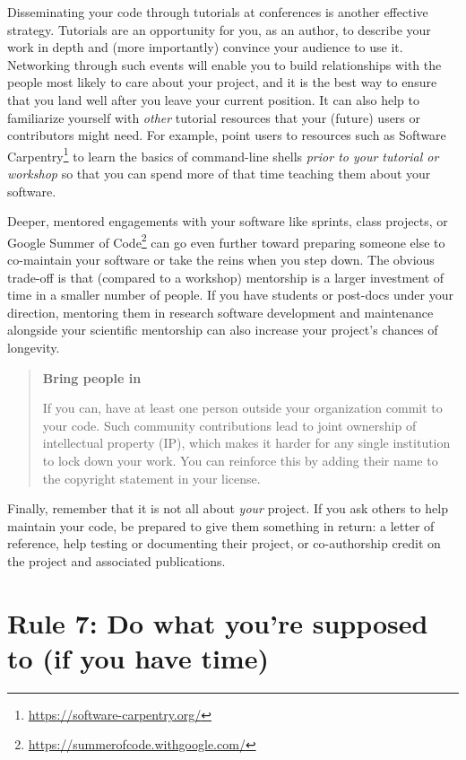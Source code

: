 \documentclass[10pt,letterpaper]{article}
\begin{document}
Disseminating your code through tutorials at conferences is another effective strategy.
Tutorials are an opportunity for you,
as an author,
to describe your work in depth
and (more importantly) convince your audience to use it.
Networking through such events will enable you to build relationships with
the people most likely to care about your project,
and it is the best way to ensure that you land well after you leave your current position.
It can also help to familiarize yourself with \emph{other} tutorial resources that your
(future) users or contributors might need.
For example, point users to resources such as Software Carpentry\footnote{\url{https://software-carpentry.org/}} to learn the basics of
command-line shells \emph{prior to your tutorial or workshop} so that you can spend
more of that time teaching them about your software.

Deeper, mentored engagements with your software like sprints, class projects,
or Google Summer of Code\footnote{\url{https://summerofcode.withgoogle.com/}}
can go even further toward preparing someone else to co-maintain your software
or take the reins when you step down.
The obvious trade-off is that (compared to a workshop)
mentorship is a larger investment of time in a smaller number of people.
If you have students or post-docs under your direction,
mentoring them in research software development and maintenance
alongside your scientific mentorship can also increase your project's chances of longevity.

\begin{quote}
  \noindent
  \textbf{Bring people in}

  If you can, have at least one person outside your organization commit to your code.
  Such community contributions lead to joint ownership of intellectual property (IP),
  which makes it harder for any single institution to lock down your work.
  You can reinforce this by adding their name to the copyright statement in your license.
\end{quote}

Finally,
remember that it is not all about \emph{your} project.
If you ask others to help maintain your code,
be prepared to give them something in return:
a letter of reference,
help testing or documenting their project,
or co-authorship credit on the project and associated publications.

\section*{Rule 7: Do what you're supposed to (if you have time)}
\end{document}
